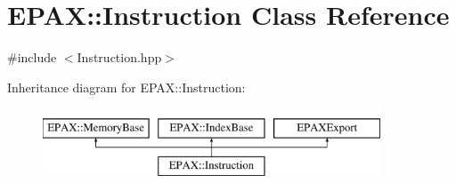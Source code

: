 \hypertarget{class_e_p_a_x_1_1_instruction}{\section{\-E\-P\-A\-X\-:\-:\-Instruction \-Class \-Reference}
\label{class_e_p_a_x_1_1_instruction}
}


{\ttfamily \#include $<$\-Instruction.\-hpp$>$}

\-Inheritance diagram for \-E\-P\-A\-X\-:\-:\-Instruction\-:\begin{figure}[H]
\begin{center}
\leavevmode
\includegraphics[height=2.000000cm]{class_e_p_a_x_1_1_instruction}
\end{center}
\end{figure}

